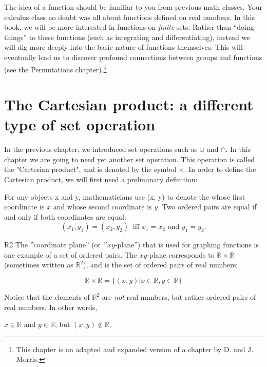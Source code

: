 
The idea of a function should be familiar to you from previous math classes. Your calculus class no doubt was all about functions defined on real numbers. In this book, we will be more interested in functions on \emph{finite} sets.  Rather than ``doing things'' to these functions (such as integrating and differentiating), instead we will dig more deeply into the basic nature of functions themselves. This will eventually lead us to discover profound connections between groups and functions (see the Permutations chapter).\footnote{This chapter  is an adapted and expanded version of a chapter by D. and J. Morris.} 

\section{The Cartesian product: a different type of set operation}

In the previous chapter, we introduced set operations such as $\cup$ and $\cap$.  In this chapter we are going to need yet another set operation. This operation is called the "Cartesian product", and is denoted by the symbol $\times$. In order to define the Cartesian product, we will first need a preliminary definition:

\begin{defn}
For any objects x and y, mathematicians use (x, y) to denote the  whose first coordinate is $x$ and whose second coordinate is $y$. Two ordered pairs are equal if and only if both coordinates are equal:  
\[
(x_1,y_1) = (x_2,y_2)~ \mbox{ iff }  x_1 = x_2 \mbox{ and } y_1 = y_2. \] 
\end{defn}

\begin{example}{R2}
The ''coordinate plane'' (or '$'xy$-plane'') that is used for graphing functions is one example of a set of ordered pairs. The $xy$-plane corresponds to ${\mathbb R} \times {\mathbb R}$  (sometimes written as  ${\mathbb R}^2$),  and is the set of ordered pairs of real numbers:

\[ 
{\mathbb R} \times {\mathbb R} = \{ (x, y) | x \in {\mathbb R}, y \in {\mathbb R} \} \]

Notice that the elements of ${\mathbb R}^2$ are  \emph{not} real numbers, but rather ordered pairs of real numbers.  In other words, 

\begin{center}
$x \in {\mathbb R}$ and $y \in  {\mathbb R}$, but $(x, y) \notin {\mathbb R}$.
\end{center}

\end{example}

